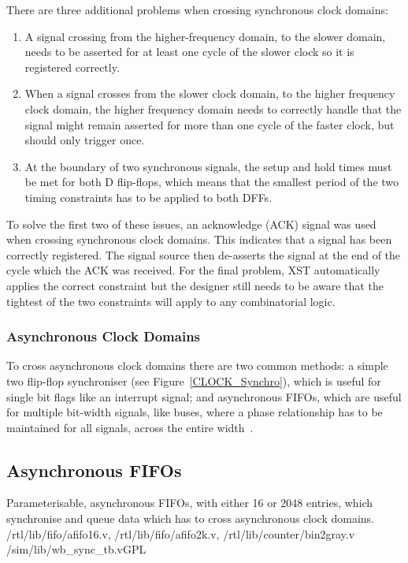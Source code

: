 There are three additional problems when crossing synchronous clock domains:
\begin{enumerate}
\item A signal crossing from the higher-frequency domain, to the slower domain, needs
to be asserted for at least one cycle of the slower clock so it is registered
correctly.
\item  When a signal crosses from the slower clock domain, to the higher frequency
clock domain, the higher frequency domain needs to correctly handle that the
signal might remain asserted for more than one cycle of the faster clock, but
should only trigger once.
\item At the boundary of two synchronous signals, the setup and hold times must
be met for both D flip-flops, which means that the smallest period of the two
timing constraints has to be applied to both DFFs.
\end{enumerate}

To solve the first two of these issues, an acknowledge (ACK) signal was used
when crossing synchronous clock domains. This indicates that a signal has been
correctly registered. The signal source then de-asserts the signal at the end of
the cycle which the ACK was received. For the final problem, XST automatically
applies the correct constraint but the designer still needs to be aware that
the tightest of the two constraints will apply to any combinatorial logic.


\subsubsection{Asynchronous Clock Domains}
\label{CLOCK_Async_Domains}
To cross asynchronous clock domains there are two common methods: a simple two
flip-flop synchroniser (see Figure~\ref{CLOCK_Synchro}), which is useful for
single bit flags like an interrupt signal; and asynchronous FIFOs, which are
useful for multiple bit-width signals, like buses, where a phase relationship
has to be maintained for all signals, across the entire width~\cite{Async_FIFO}.

\subsection{Asynchronous FIFOs}
\label{CLOCK_Async_FIFO}

{Parameterisable, asynchronous FIFOs, with either 16 or 2048 entries, which
synchronise and queue data which has to cross asynchronous clock domains.}
{/rtl/lib/fifo/afifo16.v, /rtl/lib/fifo/afifo2k.v, /rtl/lib/counter/bin2gray.v}
{/sim/lib/wb\_sync\_tb.v}{GPL}

